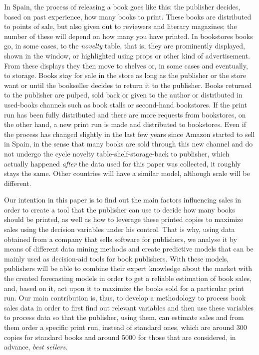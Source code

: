 \documentclass[a4paper,10pt,twocolumn,preprint,3p]{elsarticle}
\begin{document}
In Spain, the process of releasing a book goes like this: the
publisher decides, based on past experience, how many books to
print. These books are distributed to points of sale, but also given
out to reviewers and literary magazines; the number of these will
depend on how many you have printed. In bookstores books  go, in some cases, to
the {\em novelty} table, that is, they are prominently displayed, shown in the window, or highlighted using props or other 
kind of advertisement. From these displays they then move to shelves
or, in some cases and eventually, to storage. Books stay for sale in the store as long as the
publisher or the store want or until the bookseller decides to return it
to the publisher. Books returned to the publisher are pulped, sold back or
given to the author or distributed in used-books channels such as
book stalls or second-hand bookstores. If the print run has been fully
distributed and there are more requests from bookstores, on the other
hand, a new print run is made and distributed to bookstores. 
Even if the process has changed slightly 
in the last few years since Amazon started to sell in Spain, in the
sense that many books are sold through this new channel and do not
undergo the cycle novelty table-shelf-storage-back to publisher, which
actually happened {\em after} the data used for this paper was
collected, it roughly stays the same. Other countries will have a
similar model, although scale will be different. 

Our intention in this paper is to find out the main factors influencing
sales in order to create a tool that the publisher can use to decide how
many books should be printed, as well as how to leverage these printed
copies to maximize sales using the decision variables under his
control. That is why, using data obtained from a  company that sells
software for publishers, we analyse it by means of different data
mining methods and create predictive models that can be mainly used as
decision-aid tools for book publishers. With these models, publishers
will be able to 
combine their expert knowledge about the market with the created
forecasting models in order to get a reliable estimation of book
sales, and, based on it, act upon it to maximize the books sold for a
particular print run. Our main contribution is, thus, to develop a
methodology to process book sales data in order to first find out
relevant variables and then use these variables to process data so
that the publisher, using them, can estimate sales and from them order
a specific print run, instead of standard ones, which are around 300
copies for standard books and around 5000 for those that are
considered, in advance, {\em best sellers}.
\end{document}
